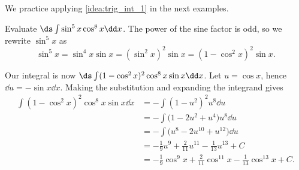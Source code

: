 We practice applying \autoref{idea:trig_int_1} in the next examples.

\begin{example}\label{ex_trigint1}%
Evaluate $\ds\int\sin^5x\cos^8x\dd x$.
\solution
The power of the sine factor is odd, so we rewrite $\sin^5x$ as
\[\sin^5x = \sin^4x\sin x = (\sin^2x)^2\sin x = (1-\cos^2x)^2\sin x.\]

Our integral is now $\ds \int (1-\cos^2x)^2\cos^8x\sin x\dd x$. Let $u = \cos x$, hence $\dd u = -\sin x\dd x$. Making the substitution and expanding the integrand gives
\begin{align*}
 \int (1-\cos^2x)^2\cos^8x\sin x\dd x
 &= -\int (1-u^2)^2u^8\dd u \\
 &= -\int \bigl(1-2u^2+u^4\bigr)u^8\dd u \\
 &= -\int \bigl(u^8-2u^{10}+u^{12}\bigr)\dd u \\
 &= -\frac19u^9 + \frac2{11}u^{11} - \frac1{13}u^{13} + C \\
 &=-\frac19\cos^9 x + \frac2{11}\cos^{11} x - \frac1{13}\cos^{13} x + C.
\end{align*}
\end{example}

